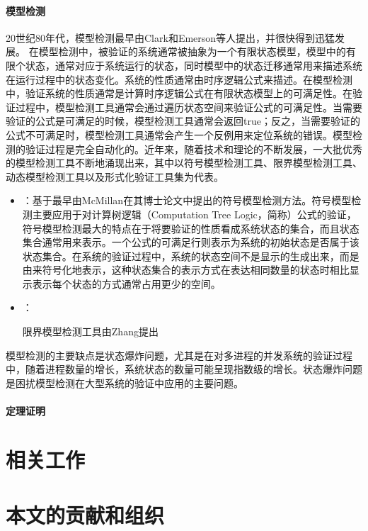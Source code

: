 \paragraph{模型检测}
20世纪80年代，模型检测\cite{CGP01,BouajjaniJNT00,BaierKatoen08}最早由Clark和Emerson等人提出，并很快得到迅猛发展。
在模型检测中，被验证的系统通常被抽象为一个有限状态模型，模型中的有限个状态，通常对应于系统运行的状态，同时模型中的状态迁移通常用来描述系统在运行过程中的状态变化。系统的性质通常由时序逻辑公式来描述。在模型检测中，验证系统的性质通常是计算时序逻辑公式在有限状态模型上的可满足性。在验证过程中，模型检测工具通常会通过遍历状态空间来验证公式的可满足性。当需要验证的公式是可满足的时候，模型检测工具通常会返回true；反之，当需要验证的公式不可满足时，模型检测工具通常会产生一个反例用来定位系统的错误。模型检测的验证过程是完全自动化的。近年来，随着技术和理论的不断发展，一大批优秀的模型检测工具不断地涌现出来，其中以符号模型检测工具\nusmv{}\cite{CimattiCGR99}、限界模型检测工具\verds{}\cite{Zhang14}、动态模型检测工具\cite{Holzmann97}以及形式化验证工具集\CADP{}\cite{GaravelLMS13}为代表。
\begin{itemize}
	\item \nusmv{}：\nusmv{}基于最早由McMillan在其博士论文\cite{mcmillan93}中提出的符号模型检测方法。符号模型检测主要应用于对计算树逻辑（Computation Tree Logic，简称\CTL{}）公式的验证，符号模型检测最大的特点在于将要验证的性质看成系统状态的集合，而且状态集合通常用\BDD{}\cite{Bryant86}来表示。一个\CTL{}公式的可满足行则表示为系统的初始状态是否属于该状态集合。在系统的验证过程中，系统的状态空间不是显示的生成出来，而是由\BDD{}来符号化地表示，这种状态集合的表示方式在表达相同数量的状态时相比显示表示每个状态的方式通常占用更少的空间。
	\item \verds{}：
	
	限界模型检测工具\verds{}由Zhang提出
\end{itemize}

模型检测的主要缺点是状态爆炸问题，尤其是在对多进程的并发系统的验证过程中，随着进程数量的增长，系统状态的数量可能呈现指数级的增长。状态爆炸问题是困扰模型检测在大型系统的验证中应用的主要问题。

\paragraph{定理证明}
\section{相关工作}
\section{本文的贡献和组织}